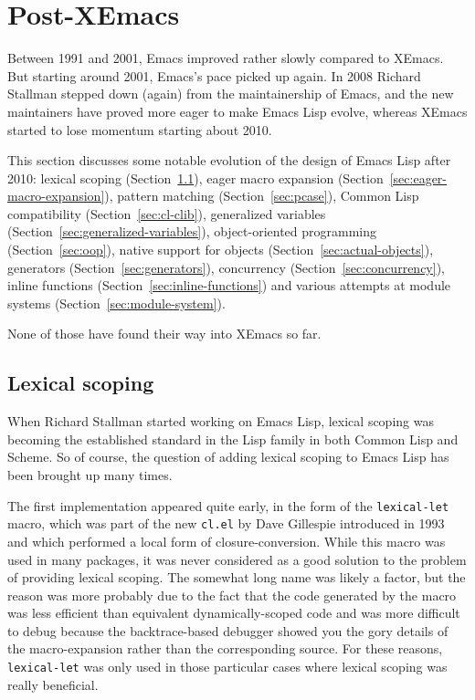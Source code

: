 \documentclass[format=acmsmall, review]{acmart}
\newcommand \Elisp {Emacs Lisp}
\begin{document}
\section{Post-XEmacs}           %
\label{sec:post-xemacs}

Between 1991 and 2001, Emacs improved rather slowly compared to XEmacs.
But starting around 2001, Emacs's pace picked up again.  In 2008 Richard
Stallman stepped down (again) from the maintainership of Emacs, and the new
maintainers have proved more eager to make \Elisp{} evolve, whereas XEmacs
started to lose momentum starting about 2010.

This section discusses some notable evolution of the design of
\Elisp{} after 2010: lexical scoping
(Section~\ref{sec:lexical-scoping}),
eager macro expansion (Section~\ref{sec:eager-macro-expansion}),
pattern matching (Section~\ref{sec:pcase}),
Common Lisp compatibility
(Section~\ref{sec:cl-clib}), generalized variables
(Section~\ref{sec:generalized-variables}), object-oriented programming
(Section~\ref{sec:oop}), native support for objects
(Section~\ref{sec:actual-objects}), generators
(Section~\ref{sec:generators}), concurrency
(Section~\ref{sec:concurrency}), inline functions
(Section~\ref{sec:inline-functions}) and various attempts at module
systems (Section~\ref{sec:module-system}).

None of those have found their way into XEmacs so far.

\subsection{Lexical scoping}
\label{sec:lexical-scoping}

When Richard Stallman started working on \Elisp, lexical scoping
was becoming the established standard in the Lisp family in both
Common Lisp and Scheme.  So of course, the question of adding lexical
scoping to \Elisp{} has been brought up many times.

The first implementation appeared quite early, in the form of the
\texttt{lexical-let} macro, which was part of the new \texttt{cl.el} by Dave
Gillespie  introduced in 1993 and which
performed a local form of closure-conversion.
While this macro was used in many packages, it was never considered as
a good solution to the problem of providing lexical scoping.
The somewhat long name was likely a factor, but the reason was more probably
due to the fact that the code generated by the macro was less efficient than
equivalent dynamically-scoped code and was more difficult to debug because
the backtrace-based debugger showed you the gory details of the
macro-expansion rather than the corresponding source.  For these reasons,
\texttt{lexical-let} was only used in those particular cases where lexical
scoping was really beneficial.
\end{document}
